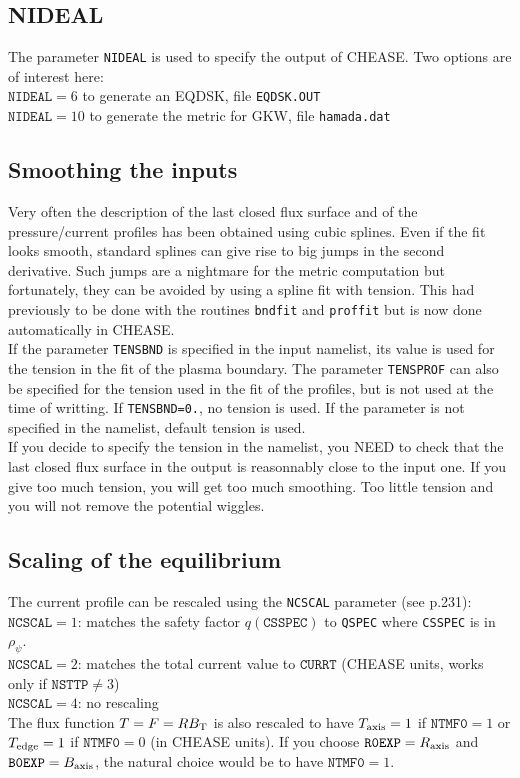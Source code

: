 \documentclass[a4paper,12pt]{article}
\newcommand{\ind}[1]{\ensuremath{_{\rm{#1}}}}
\begin{document}
\subsection{NIDEAL}
The parameter \texttt{NIDEAL} is used to specify the output of CHEASE. Two options are of interest here:\\
$\texttt{NIDEAL}=6$ to generate an EQDSK, file \texttt{EQDSK.OUT}\\
$\texttt{NIDEAL}=10$ to generate the metric for GKW, file \texttt{hamada.dat}\\

\subsection{Smoothing the inputs}
Very often the description of the last closed flux surface and of the pressure/current profiles has been obtained using cubic splines. Even if the fit looks smooth, standard splines can give rise to big jumps in the second derivative. Such jumps are a nightmare for the metric computation but fortunately, they can be avoided by using a spline fit with tension. This had previously to be done with the routines \texttt{bndfit} and \texttt{proffit} but is now done automatically in CHEASE.\\
If the parameter \texttt{TENSBND} is specified in the input namelist, its value is used for the tension in the fit of the plasma boundary.
The parameter \texttt{TENSPROF} can also be specified for the tension used in the fit of the profiles, but is not used at the time of writting. 
If \texttt{TENSBND=0.}, no tension is used. If the parameter is not specified in the namelist, default tension is used.\\

If you decide to specify the tension in the namelist, you NEED to check that the last closed flux surface in the output is reasonnably close to the input one. If you give too much tension, you will get too much smoothing. Too little tension and you will not remove the potential wiggles. 

\subsection{Scaling of the equilibrium}
The current profile can be rescaled using the \texttt{NCSCAL} parameter (see \cite{Lutjens:Comput1996} p.231):\\
$\texttt{NCSCAL}=1$: matches the safety factor $q(\texttt{CSSPEC})$ to \texttt{QSPEC} where \texttt{CSSPEC} is in $\rho_\psi$.\\
$\texttt{NCSCAL}=2$: matches the total current value to $\texttt{CURRT}$ (CHEASE units, works only if $\texttt{NSTTP}\neq3$)\\
$\texttt{NCSCAL}=4$: no rescaling\\
The flux function $T=F=R B\ind{T}$ is also rescaled to have $T\ind{axis}=1$ if $\texttt{NTMF0}=1$ or $T\ind{edge}=1$ if $\texttt{NTMF0}=0$ (in CHEASE units). If you choose $\texttt{R0EXP}=R\ind{axis}$
and $\texttt{B0EXP}=B\ind{axis}$, the natural choice would be to have $\texttt{NTMF0}=1$.
\end{document}
